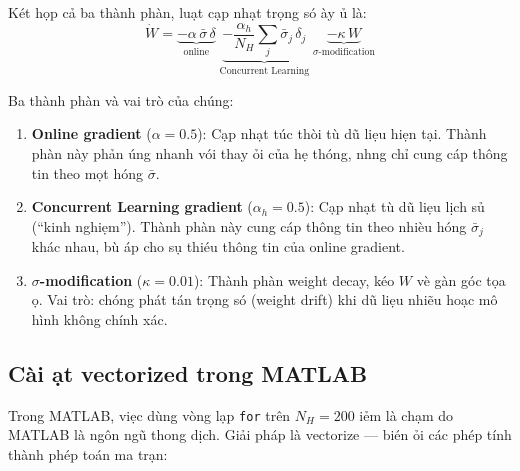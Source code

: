 \documentclass[12pt,a4paper]{article}
\begin{document}
K\'{e}t h\d{o}p c\h{a} ba th\`{a}nh ph\`{a}n, lu\d{a}t c\d{a}p nh\d{a}t tr\d{o}ng s\'{o} \dj\`{a}y \dj\h{u} l\`{a}:
\begin{equation}\label{eq:total_update}
    \boxed{\dot{W} = \underbrace{-\alpha\, \bar{\sigma}\, \delta}_\text{online} \; \underbrace{-\frac{\alpha_h}{N_H} \sum_j \bar{\sigma}_j\, \delta_j}_\text{Concurrent Learning} \; \underbrace{-\kappa\, W}_\text{$\sigma$-modification}}
\end{equation}

Ba th\`{a}nh ph\`{a}n v\`{a} vai tr\`{o} c\h{u}a ch\'{u}ng:
\begin{enumerate}
    \item \textbf{Online gradient} ($\alpha = 0.5$): C\d{a}p nh\d{a}t t\'{u}c th\`{o}i t\`{u} d\~{u} li\d{e}u hi\d{e}n t\d{a}i. Th\`{a}nh ph\`{a}n n\`{a}y ph\h{a}n \'{u}ng nhanh v\'{o}i thay \dj\h{o}i c\h{u}a h\d{e} th\'{o}ng, nh\uhorn{}ng ch\h{i} cung c\'{a}p th\^{o}ng tin theo m\d{o}t h\uhorn{}\'{o}ng $\bar{\sigma}$.

    \item \textbf{Concurrent Learning gradient} ($\alpha_h = 0.5$): C\d{a}p nh\d{a}t t\`{u} d\~{u} li\d{e}u l\d{i}ch s\h{u} (``kinh nghi\d{e}m''). Th\`{a}nh ph\`{a}n n\`{a}y cung c\'{a}p th\^{o}ng tin theo nhi\`{e}u h\uhorn{}\'{o}ng $\bar{\sigma}_j$ kh\'{a}c nhau, b\`{u} \dj\'{a}p cho s\d{u} thi\'{e}u th\^{o}ng tin c\h{u}a online gradient.

    \item \textbf{$\sigma$-modification} ($\kappa = 0.01$): Th\`{a}nh ph\`{a}n weight decay, k\'{e}o $W$ v\`{e} g\`{a}n g\'{o}c t\d{o}a \dj\d{o}. Vai tr\`{o}: ch\'{o}ng ph\'{a}t t\'{a}n tr\d{o}ng s\'{o} (weight drift) khi d\~{u} li\d{e}u nhi\~{e}u ho\d{a}c m\^{o} h\`{i}nh kh\^{o}ng ch\'{i}nh x\'{a}c.
\end{enumerate}

\subsection{C\`{a}i \dj\d{a}t vectorized trong MATLAB}

Trong MATLAB, vi\d{e}c d\`{u}ng v\`{o}ng l\d{a}p \texttt{for} tr\^{e}n $N_H = 200$ \dj i\h{e}m l\`{a} ch\d{a}m do MATLAB l\`{a} ng\^{o}n ng\~{u} thong d\d{i}ch. Gi\h{a}i ph\'{a}p l\`{a} vectorize --- bi\'{e}n \dj\h{o}i c\'{a}c ph\'{e}p t\'{i}nh th\`{a}nh ph\'{e}p to\'{a}n ma tr\d{a}n:
\end{document}
